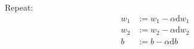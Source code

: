 Repeat:
\begin{align}
	w_1 &:= w_1 - \alpha \mathrm{d} w_1 \\
	w_2 &:= w_2 - \alpha \mathrm{d} w_2 \\
	  b &:= b - \alpha \mathrm{d} b
\end{align}

